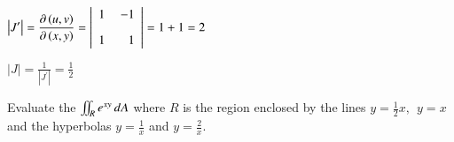 \documentclass[11pt]{extarticle}
\newcommand{\miint}{\iint\displaylimits}
\begin{document}
\begin{minipage}[t]{0.37\linewidth}
      \vspace{2ex}
      $\begin{aligned}
         \left| J^{\prime} \right| = 
      \frac{\partial\left(u,v\right)}{\partial\left(x,y\right)} &=
      \left|\begin{array}{rr}
         1 &\hspace{0.25em} -1 \\[2ex]
         1 &\hspace{0.25em} 1
      \end{array}\right| =1+1=2
      \end{aligned}$

      \vspace{2ex}
      $|J| = \frac{1}{|J^{\prime}|} = \frac{1}{2}$
\end{minipage}

\pagebreak
\textbf{} Evaluate the $\miint_R e^{x y} \,dA$ where $R$ is the region enclosed by the lines $y=\frac{1}{2}x,\ \ y=x$ and the hyperbolas $y=\frac{1}{x}$ and $y=\frac{2}{x}$.
\end{document}

